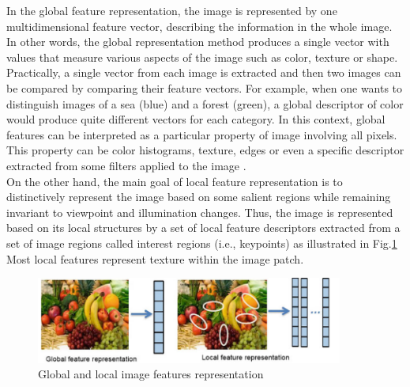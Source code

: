 In the global feature representation, the image is represented by one multidimensional
feature vector, describing the information in the whole image.
In other words, the global representation method produces a single vector with values that
measure various aspects of the image such as color, texture or shape. Practically, a
single vector from each image is extracted and then two images can be compared by
comparing their feature vectors. For example, when one wants to distinguish images
of a sea (blue) and a forest (green), a global descriptor of color would produce quite
different vectors for each category. In this context, global features can be interpreted
as a particular property of image involving all pixels.
This property can be color histograms, texture, edges or even a specific descriptor extracted from some filters
applied to the image \cite{h}.\\ On the other hand, the main goal of local feature representation
is to distinctively represent the image based on some salient regions while
remaining invariant to viewpoint and illumination changes. Thus, the image is represented
based on its local structures by a set of local feature descriptors extracted
from a set of image regions called interest regions (i.e., keypoints) as illustrated in
Fig.\ref{fig:Ft1} Most local features represent texture within the image patch.

\begin{figure}[H]
\centering
\includegraphics[width=0.9\textwidth]{img/features.PNG}
\caption{ Global and local image features representation }
\label{fig:Ft1}
\end{figure}

